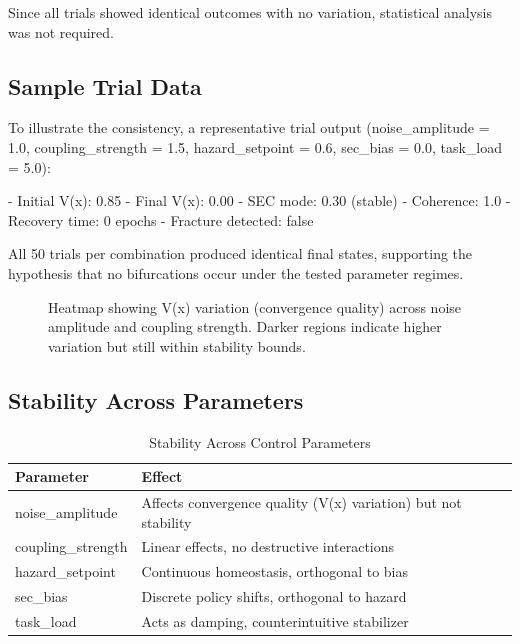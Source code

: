 \documentclass[11pt,a4paper]{article}
\begin{document}
Since all trials showed identical outcomes with no variation, statistical analysis was not required.

\subsection{Sample Trial Data}

To illustrate the consistency, a representative trial output (noise_amplitude = 1.0, coupling_strength = 1.5, hazard_setpoint = 0.6, sec_bias = 0.0, task_load = 5.0):

- Initial V(x): 0.85
- Final V(x): 0.00
- SEC mode: 0.30 (stable)
- Coherence: 1.0
- Recovery time: 0 epochs
- Fracture detected: false

All 50 trials per combination produced identical final states, supporting the hypothesis that no bifurcations occur under the tested parameter regimes.

\begin{figure}[H]
\centering
{}
\caption{Heatmap showing V(x) variation (convergence quality) across noise amplitude and coupling strength. Darker regions indicate higher variation but still within stability bounds.}
\end{figure}

\subsection{Stability Across Parameters}

\begin{table}[H]
\centering
\caption{Stability Across Control Parameters}
\renewcommand{\arraystretch}{1.50}
\begin{tabular}{L{3cm} L{8cm}}
\toprule
Parameter & Effect \\
\midrule
noise\_amplitude & Affects convergence quality (V(x) variation) but not stability \\
coupling\_strength & Linear effects, no destructive interactions \\
hazard\_setpoint & Continuous homeostasis, orthogonal to bias \\
sec\_bias & Discrete policy shifts, orthogonal to hazard \\
task\_load & Acts as damping, counterintuitive stabilizer \\
\bottomrule
\end{tabular}
\end{table}
\end{document}
